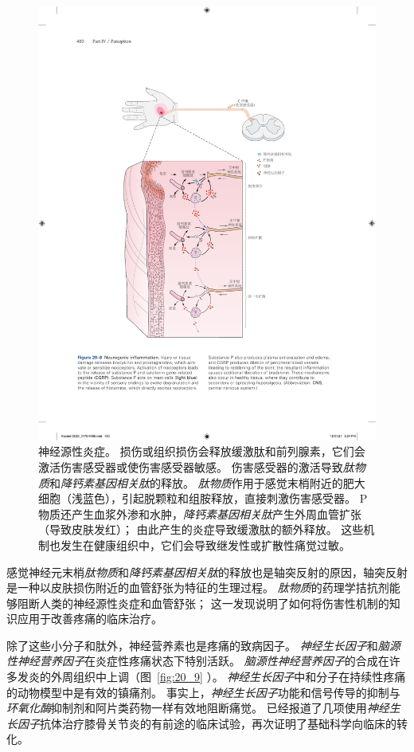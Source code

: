 \begin{figure}[htbp]
	\centering
	\includegraphics[width=0.87\linewidth]{chap20/fig_20_8}
	\caption{神经源性炎症。
		损伤或组织损伤会释放缓激肽和前列腺素，它们会激活伤害感受器或使伤害感受器敏感。
		伤害感受器的激活导致\textit{肽物质}和\textit{降钙素基因相关肽}的释放。
		\textit{肽物质}作用于感觉末梢附近的肥大细胞（浅蓝色），引起脱颗粒和组胺释放，直接刺激伤害感受器。
		P物质还产生血浆外渗和水肿，\textit{降钙素基因相关肽}产生外周血管扩张（导致皮肤发红）；
		由此产生的炎症导致缓激肽的额外释放。
		这些机制也发生在健康组织中，它们会导致继发性或扩散性痛觉过敏。}
	\label{fig:20_8}
\end{figure}


感觉神经元末梢\textit{肽物质}和\textit{降钙素基因相关肽}的释放也是轴突反射的原因，轴突反射是一种以皮肤损伤附近的血管舒张为特征的生理过程。
\textit{肽物质}的药理学拮抗剂能够阻断人类的神经源性炎症和血管舒张；
这一发现说明了如何将伤害性机制的知识应用于改善疼痛的临床治疗。


除了这些小分子和肽外，神经营养素也是疼痛的致病因子。
\textit{神经生长因子}和\textit{脑源性神经营养因子}在炎症性疼痛状态下特别活跃。
\textit{脑源性神经营养因子}的合成在许多发炎的外周组织中上调（图~\ref{fig:20_9} ）。
\textit{神经生长因子}中和分子在持续性疼痛的动物模型中是有效的镇痛剂。
事实上，\textit{神经生长因子}功能和信号传导的抑制与\textit{环氧化酶}抑制剂和阿片类药物一样有效地阻断痛觉。
已经报道了几项使用\textit{神经生长因子}抗体治疗膝骨关节炎的有前途的临床试验，再次证明了基础科学向临床的转化。


